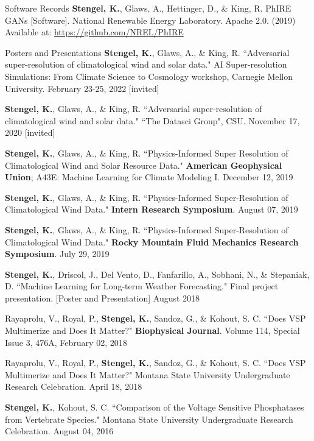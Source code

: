 \documentclass{resume} %
\begin{document}
\iftrue
\begin{rSection}{Software Records}
\textbf{Stengel, K.}, Glaws, A., Hettinger, D., \& King, R. PhIRE GANs [Software]. National Renewable Energy Laboratory. Apache 2.0. (2019) Available at: \url{https://github.com/NREL/PhIRE} %
\end{rSection}
\fi
\iftrue
\begin{rSection}{Posters and Presentations}
\setlength \itemsep{-0.4em}
\textbf{Stengel, K.}, Glaws, A., \& King, R. ``Adversarial super-resolution of climatological wind and solar data." AI Super-resolution Simulations: From Climate Science to Cosmology workshop, Carnegie Mellon University. February 23-25, 2022 [invited]

\textbf{Stengel, K.}, Glaws, A., \& King, R. ``Adversarial super-resolution of climatological wind and solar data." ``The Datasci Group", CSU. November 17, 2020 [invited]

\textbf{Stengel, K.}, Glaws, A., \& King, R. ``Physics-Informed Super Resolution of Climatological Wind and Solar Resource Data." \textbf{American Geophysical Union}; A43E: Machine Learning for Climate Modeling I. December 12, 2019

\textbf{Stengel, K.}, Glaws, A., \& King, R. ``Physics-Informed Super-Resolution of Climatological Wind Data." \textbf{Intern Research Symposium}. August 07, 2019

\textbf{Stengel, K.}, Glaws, A., \& King, R. ``Physics-Informed Super-Resolution of Climatological Wind Data." \textbf{Rocky Mountain Fluid Mechanics Research Symposium}. July 29, 2019

\textbf{Stengel, K.}, Driscol, J., Del Vento, D., Fanfarillo, A., Sobhani, N., \& Stepaniak, D. ``Machine Learning for Long-term Weather Forecasting." Final project presentation. [Poster and Presentation] August 2018

Rayaprolu, V., Royal, P., \textbf{Stengel, K.}, Sandoz, G., \& Kohout, S. C. ``Does VSP Multimerize and Does It Matter?" \textbf{Biophysical Journal}. Volume 114, Special Issue 3, 476A, February 02, 2018

Rayaprolu, V., Royal, P., \textbf{Stengel, K.}, Sandoz, G., \& Kohout, S. C. ``Does VSP Multimerize and Does It Matter?" Montana State University Undergraduate Research Celebration. April 18, 2018

\textbf{Stengel, K.}, Kohout, S. C. ``Comparison of the Voltage Sensitive Phosphatases from Vertebrate Species." Montana State University Undergraduate Research Celebration. August 04, 2016
\end{rSection}
\end{document}

